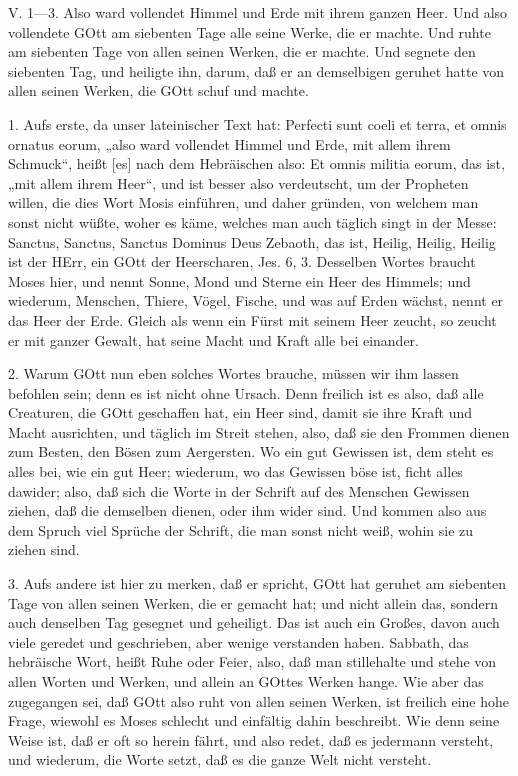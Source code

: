 \begin{schriftzitat}
V. 1—3. Also ward vollendet Himmel und Erde mit ihrem ganzen Heer. Und also vollendete GOtt am siebenten Tage alle seine Werke, die er machte. Und ruhte am siebenten Tage von allen seinen Werken, die er machte. Und segnete den siebenten Tag, und heiligte ihn, darum, daß er an demselbigen geruhet hatte von allen seinen Werken, die GOtt schuf und machte.
\end{schriftzitat}

1. Aufs erste, da unser lateinischer Text hat: Perfecti sunt coeli et terra, et omnis ornatus eorum, „also ward vollendet Himmel und Erde, mit allem ihrem Schmuck“, heißt [es] nach dem Hebräischen also: Et omnis militia eorum, das ist, „mit allem ihrem Heer“, und ist besser also verdeutscht, um der Propheten willen, die dies Wort Mosis einführen, und daher gründen, von welchem man sonst nicht wüßte, woher es käme, welches man auch täglich singt in der Messe: Sanctus, Sanctus, Sanctus Dominus Deus Zebaoth, das ist, Heilig, Heilig, Heilig ist der HErr, ein GOtt der Heerscharen, Jes. 6, 3. Desselben Wortes braucht Moses hier, und nennt Sonne, Mond und Sterne ein Heer des Himmels; und wiederum, Menschen, Thiere, Vögel, Fische, und was auf Erden wächst, nennt er das Heer der Erde. Gleich als wenn ein Fürst mit seinem Heer zeucht, so zeucht er mit ganzer Gewalt, hat seine Macht und Kraft alle bei einander.

2. Warum GOtt nun eben solches Wortes brauche, müssen wir ihm lassen befohlen sein; denn es ist nicht ohne Ursach. Denn freilich ist es also, daß alle Creaturen, die GOtt geschaffen hat, ein Heer sind, damit sie ihre Kraft und Macht ausrichten, und täglich im Streit stehen, also, daß sie den Frommen dienen zum Besten, den Bösen zum Aergersten. Wo ein gut Gewissen ist, dem steht es alles bei, wie ein gut Heer; wiederum, wo das Gewissen böse ist, ficht alles dawider; also, daß sich die Worte in der Schrift auf des Menschen Gewissen ziehen, daß die demselben dienen, oder ihm wider sind. Und kommen also aus dem Spruch viel Sprüche der Schrift, die man sonst nicht weiß, wohin sie zu ziehen sind.

3. Aufs andere ist hier zu merken, daß er spricht, GOtt hat geruhet am siebenten Tage von allen seinen Werken, die er gemacht hat; und nicht allein das, sondern auch denselben Tag gesegnet und geheiligt. Das ist auch ein Großes, davon auch viele geredet und geschrieben, aber wenige verstanden haben. Sabbath, das hebräische Wort, heißt Ruhe oder Feier, also, daß man stillehalte und stehe von allen Worten und Werken, und allein an GOttes Werken hange. Wie aber das zugegangen sei, daß GOtt also ruht von allen seinen Werken, ist freilich eine hohe Frage, wiewohl es Moses schlecht und einfältig dahin beschreibt. Wie denn seine Weise ist, daß er oft so herein fährt, und also redet, daß es jedermann versteht, und wiederum, die Worte setzt, daß es die ganze Welt nicht versteht.

